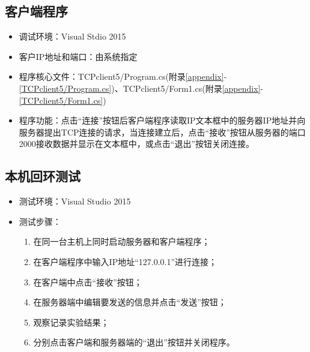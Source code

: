 \documentclass[a4paper]{ctexrep}
\begin{document}
\begin{spacing}{1.5}
\subsection{客户端程序}
\begin{itemize}
	\item 调试环境：Visual Stdio 2015
	\item 客户IP地址和端口：由系统指定
	\item 程序核心文件：TCPclient5/Program.cs(附录\ref{appendix}-\ref{TCPclient5/Program.cs})、TCPclient5/Form1.cs(附录\ref{appendix}-\ref{TCPclient5/Form1.cs})
	\item 程序功能：点击“连接”按钮后客户端程序读取IP文本框中的服务器IP地址并向服务器提出TCP连接的请求，当连接建立后，点击“接收”按钮从服务器的端口2000接收数据并显示在文本框中，或点击“退出”按钮关闭连接。
\end{itemize}
\subsection{本机回环测试}
\begin{itemize}
	\item 测试环境：Visual Studio 2015
	\item 测试步骤：
	\begin{enumerate}
		\item 在同一台主机上同时启动服务器和客户端程序；
		\item 在客户端程序中输入IP地址“127.0.0.1”进行连接；
		\item 在客户端中点击“接收”按钮；
		\item 在服务器端中编辑要发送的信息并点击“发送”按钮；
		\item 观察记录实验结果；
		\item 分别点击客户端和服务器端的“退出”按钮并关闭程序。
	\end{enumerate}
\end{itemize}


\end{spacing}
\end{document}

